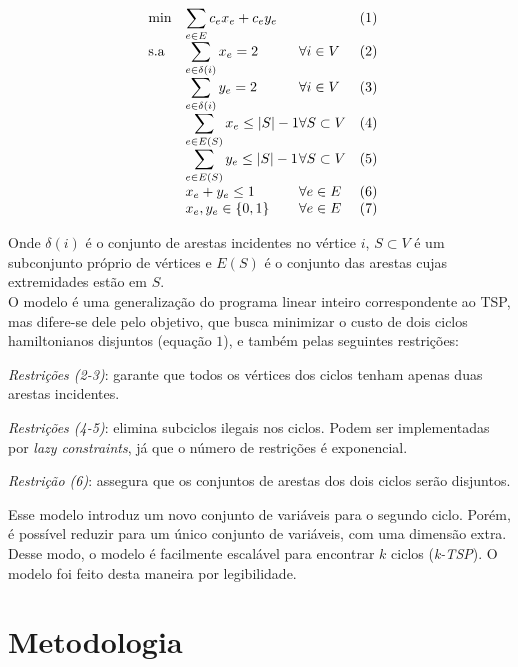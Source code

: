 \documentclass{TEMA}
\begin{document}
\begin{equation*}
\begin{array}{ll@{}ll@{}ll}
\text{min}  & \displaystyle\sum\limits_{e \in E} c_{e}x_{e} + c_{e}y_{e} & &(1)\\
\text{s.a}       & \displaystyle\sum\limits_{e \in \delta(i)} x_{e} = 2 & \forall i \in V &(2)\\
                 & \displaystyle\sum\limits_{e \in \delta(i)} y_{e} = 2 & \forall i \in V &(3)\\
                 & \displaystyle\sum\limits_{e \in E(S)} x_{e} \leq |S|-1 & \forall S \subset V &(4)\\
                 & \displaystyle\sum\limits_{e \in E(S)} y_{e} \leq |S|-1 & \forall S \subset V &(5)\\
                 & x_e + y_e \leq 1 & \forall e \in E &(6)\\
                 & x_{e}, y_{e} \in \{0,1\} & \forall e \in E &(7)\\
\end{array}
\end{equation*}

Onde $\delta(i)$ é o conjunto de arestas incidentes no vértice $i$, $S \subset V$ é um subconjunto próprio de vértices e $E(S)$ é o conjunto das arestas cujas extremidades estão em $S$.\\

O modelo é uma generalização do programa linear inteiro correspondente ao TSP, mas difere-se dele pelo objetivo, que busca minimizar o custo de dois ciclos hamiltonianos disjuntos (equação $1$), e também pelas seguintes restrições: 

\textit{Restrições (2-3)}: garante que todos os vértices dos ciclos tenham apenas duas arestas incidentes.

\textit{Restrições (4-5)}: elimina subciclos ilegais nos ciclos. Podem ser implementadas por \textit{lazy constraints}, já que o número de restrições é exponencial.

\textit{Restrição (6)}: assegura que os conjuntos de arestas dos dois ciclos serão disjuntos.

Esse modelo introduz um novo conjunto de variáveis para o segundo ciclo. Porém, é possível reduzir para um único conjunto de variáveis, com uma dimensão extra. Desse modo, o modelo é facilmente escalável para encontrar $k$ ciclos (\textit{k-TSP}). O modelo foi feito desta maneira por legibilidade.

\section{Metodologia}
\end{document}
